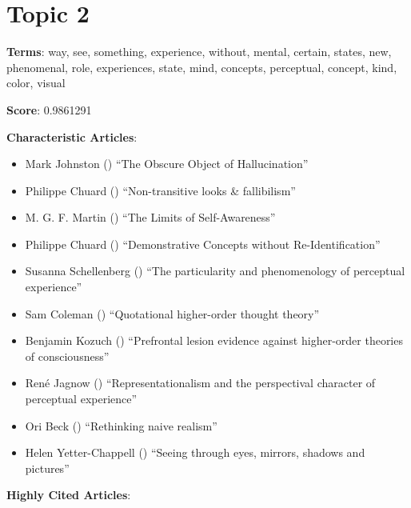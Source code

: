 \documentclass[
  10pt,
  letterpaper,
  DIV=11,
  numbers=noendperiod,
  twoside]{scrartcl}
\providecommand{\tightlist}{%
  \setlength{\itemsep}{0pt}\setlength{\parskip}{0pt}}\usepackage{longtable,booktabs,array}
\begin{document}
\section{Topic 2}\label{topic-2}

\textbf{Terms}: way, see, something, experience, without, mental,
certain, states, new, phenomenal, role, experiences, state, mind,
concepts, perceptual, concept, kind, color, visual

\textbf{Score}: 0.9861291

\textbf{Characteristic Articles}:

\begin{itemize}
\tightlist
\item
  Mark Johnston () ``The Obscure
  Object of Hallucination''
\item
  Philippe Chuard ()
  ``Non-transitive looks \& fallibilism''
\item
  M. G. F. Martin () ``The Limits
  of Self-Awareness''
\item
  Philippe Chuard ()
  ``Demonstrative Concepts without Re-Identification''
\item
  Susanna Schellenberg () ``The
  particularity and phenomenology of perceptual experience''
\item
  Sam Coleman
  ()
  ``Quotational higher-order thought theory''
\item
  Benjamin Kozuch () ``Prefrontal
  lesion evidence against higher-order theories of consciousness''
\item
  René Jagnow ()
  ``Representationalism and the perspectival character of perceptual
  experience''
\item
  Ori Beck () ``Rethinking naive
  realism''
\item
  Helen Yetter-Chappell ()
  ``Seeing through eyes, mirrors, shadows and pictures''
\end{itemize}

\textbf{Highly Cited Articles}:
\end{document}
